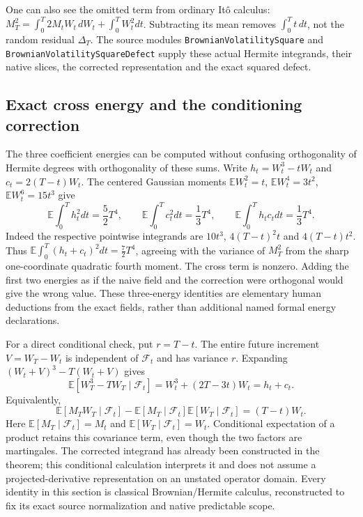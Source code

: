 \documentclass[11pt]{article}
\newcommand{\E}{\mathbb E}
\begin{document}
One can also see the omitted term from ordinary It\^o calculus:
$M_T^2=\int_0^T2M_tW_t\,dW_t+\int_0^TW_t^2dt$. Subtracting its
mean removes $\int_0^Tt\,dt$, not the random residual $\Delta_T$.
The source modules \texttt{BrownianVolatilitySquare} and
\texttt{BrownianVolatilitySquareDefect} supply these actual Hermite
integrands, their native slices, the corrected representation and
the exact squared defect.

\subsection*{Exact cross energy and the conditioning correction}
The three coefficient energies can be computed without confusing
orthogonality of Hermite degrees with orthogonality of these sums.
Write $h_t=W_t^3-tW_t$ and $c_t=2(T-t)W_t$. The centered Gaussian
moments $\E W_t^2=t$, $\E W_t^4=3t^2$, $\E W_t^6=15t^3$ give
\[
 \E\int_0^T h_t^2dt=\frac52T^4,\qquad
 \E\int_0^T c_t^2dt=\frac13T^4,\qquad
 \E\int_0^T h_tc_tdt=\frac13T^4.
\]
Indeed the respective pointwise integrands are $10t^3$,
$4(T-t)^2t$ and $4(T-t)t^2$. Thus
$\E\int_0^T(h_t+c_t)^2dt=\frac72T^4$, agreeing with the variance
of $M_T^2$ from the sharp one-coordinate quadratic fourth moment.
The cross term is nonzero. Adding the first two energies as if
the naive field and the correction were orthogonal would give the
wrong value. These three-energy identities are elementary human
deductions from the exact fields, rather than additional named
formal energy declarations.

For a direct conditional check, put $r=T-t$. The entire future
increment $V=W_T-W_t$ is independent of $\mathcal F_t$ and has
variance $r$. Expanding $(W_t+V)^3-T(W_t+V)$ gives
\[
 \E[W_T^3-TW_T\mid\mathcal F_t]
       =W_t^3+(2T-3t)W_t=h_t+c_t.
\]
Equivalently,
\[
 \E[M_TW_T\mid\mathcal F_t]
 -\E[M_T\mid\mathcal F_t]\E[W_T\mid\mathcal F_t]
       =(T-t)W_t.
\]
Here $\E[M_T\mid\mathcal F_t]=M_t$ and
$\E[W_T\mid\mathcal F_t]=W_t$. Conditional expectation of a
product retains this covariance term, even though the two factors
are martingales. The corrected integrand has already been
constructed in the theorem; this conditional calculation interprets
it and does not assume a projected-derivative representation on an
unstated operator domain. Every identity in this section is
classical Brownian/Hermite calculus, reconstructed to fix its exact
source normalization and native predictable scope.
\end{document}
